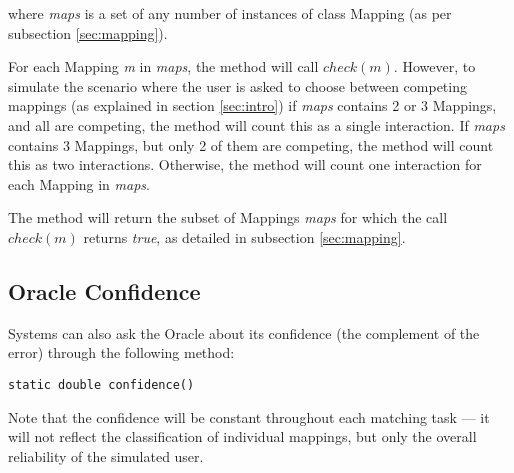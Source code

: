 \documentclass{article}
\begin{document}
\noindent
where \textit{maps} is a set of any number of instances of class Mapping (as per subsection \ref{sec:mapping}).

For each Mapping \textit{m} in \textit{maps}, the method will call $check(m)$. However, to simulate the scenario where the user is asked to choose between competing mappings (as explained in section \ref{sec:intro}) if \textit{maps} contains 2 or 3 Mappings, and all are competing, the method will count this as a single interaction. If \textit{maps} contains 3 Mappings, but only 2 of them are competing, the method will count this as two interactions. Otherwise, the method will count one interaction for each Mapping in \textit{maps}.

The method will return the subset of Mappings \textit{maps} for which the call $check(m)$ returns \textit{true}, as detailed in subsection \ref{sec:mapping}.

\subsection{Oracle Confidence}
\label{sec:confidence}
Systems can also ask the Oracle about its confidence (the complement of the error) through the following method:
\begin{verbatim}
static double confidence()
\end{verbatim}

Note that the confidence will be constant throughout each matching task --- it will not reflect the classification of individual mappings, but only the overall reliability of the simulated user.
\end{document}
